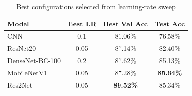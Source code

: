 \begin{table}[htbp]
\centering
\caption{Best configurations selected from learning-rate sweep}
\begin{tabular}{lccc}
\toprule
Model & Best LR & Best Val Acc & Test Acc \\
\midrule
CNN & 0.1 & 81.06\% & 76.58\% \\
ResNet20 & 0.05 & 87.14\% & 82.40\% \\
DenseNet-BC-100 & 0.2 & 87.62\% & 85.13\% \\
MobileNetV1 & 0.05 & 87.28\% & \textbf{85.64\%} \\
Res2Net & 0.05 & \textbf{89.52\%} & 85.34\% \\
\bottomrule
\end{tabular}
\label{tab:best_lr}
\end{table}
